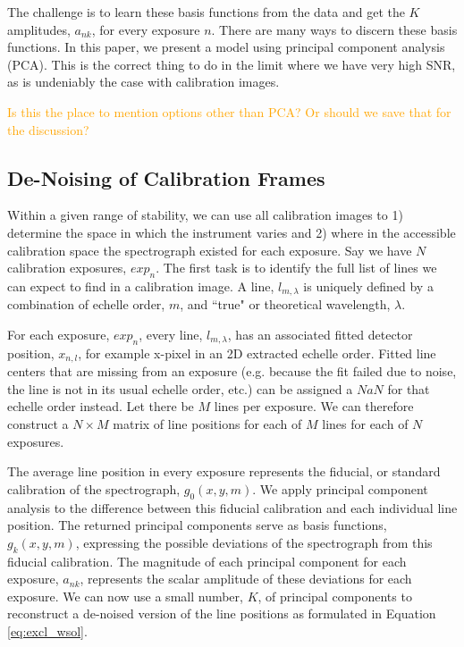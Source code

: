 \documentclass[twocolumn]{aastex63}
\newcommand{\lz}[1]{\textcolor{orange}{#1}}
\begin{document}
The challenge is to learn these basis functions from the data and get the $K$ amplitudes, $a_{nk}$, for every exposure $n$.  There are many ways to discern these basis functions.  In this paper, we present a model using principal component analysis (PCA).  This is the correct thing to do in the limit where we have very high SNR, as is undeniably the case with calibration images.

\lz{Is this the place to mention options other than PCA? Or should we save that for the discussion?}

\subsection{De-Noising of Calibration Frames} \label{sec:denoising}
Within a given range of stability, we can use all calibration images to  1) determine the space in which the instrument varies and 2) where in the accessible calibration space the spectrograph existed for each exposure.  Say we have $N$ calibration exposures, $exp_n$.  The first task is to identify the full list of lines we can expect to find in a calibration image.  A line, $l_{m,\lambda}$ is uniquely defined by a combination of echelle order, $m$, and ``true" or theoretical wavelength, $\lambda$. 

For each exposure, $exp_n$, every line, $l_{m,\lambda}$, has an associated fitted detector position, $x_{n,l}$, for example x-pixel in an 2D extracted echelle order.  Fitted line centers that are missing from an exposure (e.g. because the fit failed due to noise, the line is not in its usual echelle order, etc.) can be assigned a $NaN$ for that echelle order instead.  Let there be $M$ lines per exposure.  We can therefore construct a $N \times M$ matrix of line positions for each of $M$ lines for each of $N$ exposures.

The average line position in every exposure represents the fiducial, or standard calibration of the spectrograph, $g_0(x,y,m)$.  We apply principal component analysis to the difference between this fiducial calibration and each individual line position.  The returned principal components serve as basis functions,  $g_k(x,y,m)$, expressing the possible deviations of the spectrograph from this fiducial calibration.  The magnitude of each principal component for each exposure, $a_{nk}$, represents the scalar amplitude of these deviations for each exposure.  We can now use a small number, $K$, of principal components to reconstruct a de-noised version of the line positions as formulated in Equation \ref{eq:excl_wsol}.
\end{document}
